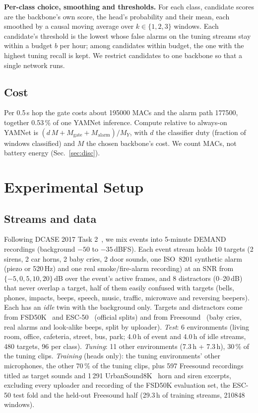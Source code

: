 \documentclass[conference]{IEEEtran}
\begin{document}
\textbf{Per-class choice, smoothing and thresholds.} For each class, candidate scores are the backbone's own score, the
head's probability and their mean, each smoothed by a causal moving average over $k\in\{1,2,3\}$ windows. Each candidate's
threshold is the lowest whose false alarms on the tuning streams stay within a budget $b$ per hour; among candidates within
budget, the one with the highest tuning recall is kept. We restrict candidates to one backbone so that a single network runs.

\subsection{Cost}
Per 0.5\,s hop the gate costs about \num{195000} MACs and the alarm path \num{177500}, together 0.53\,\% of one YAMNet
inference. Compute relative to always-on YAMNet is $(d\,M+M_\text{gate}+M_\text{alarm})/M_Y$, with $d$ the classifier duty
(fraction of windows classified) and $M$ the chosen backbone's cost. We count MACs, not battery energy
(Sec.~\ref{sec:disc}).

\section{Experimental Setup}
\subsection{Streams and data}
Following DCASE 2017 Task 2~\cite{mesaros2017dcase}, we mix events into 5-minute DEMAND~\cite{thiemann2013demand}
recordings (background $-50$ to $-35$\,dBFS). Each event stream holds 10 targets (2 sirens, 2 car horns, 2 baby cries,
2 door sounds, one ISO~8201 synthetic alarm (piezo or 520\,Hz) and one real smoke/fire-alarm recording) at an SNR from
$\{-5,0,5,10,20\}$\,dB over the event's active frames, and 8 distractors (0--20\,dB) that never overlap a target, half of
them easily confused with targets (bells, phones, impacts, beeps, speech, music, traffic, microwave and reversing beepers).
Each has an \emph{idle} twin with the background only. Targets and distractors come from FSD50K~\cite{fonseca2022fsd50k}
and ESC-50~\cite{piczak2015esc} (official splits) and from Freesound~\cite{font2013freesound} (baby cries, real alarms and
look-alike beeps, split by uploader). \emph{Test}: 6 environments (living room, office, cafeteria, street, bus, park;
4.0\,h of event and 4.0\,h of idle streams, 480 targets, 96 per class). \emph{Tuning}: 11 other environments (7.3\,h +
7.3\,h), 30\,\% of the tuning clips. \emph{Training} (heads only): the tuning environments' other microphones, the other
70\,\% of the tuning clips, plus 597 Freesound recordings titled as target sounds and 1\,291 UrbanSound8K~\cite{salamon2014us8k}
horn and siren excerpts, excluding every uploader and recording of the FSD50K evaluation set, the ESC-50 test fold and the
held-out Freesound half (29.3\,h of training streams, \num{210848} windows).
\end{document}
